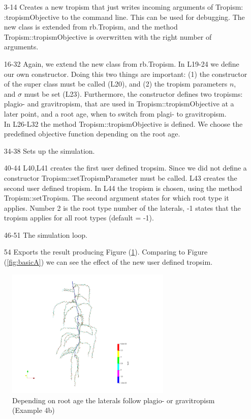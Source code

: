 \documentclass[a4paper]{article}
\begin{document}
\begin{itemize}

\item[3-14] Creates a new tropism that just writes incoming arguments of Tropism: :tropismObjective to the command line. This can be used for debugging. The new class is extended from rb.Tropism, 
and the method Tropism::tropismObjective is overwritten with the right number of arguments.

\item[16-32] Again, we extend the new class from rb.Tropism. In L19-24 we define our own constructor.
Doing this two things are important: (1) the constructor of the super class must be called (L20), and (2) the tropism parameters $n$, and $\sigma$ must be set (L23). 
Furthermore, the constructor defines two tropisms: plagio- and gravitropism, that are used in Tropism::tropismObjective at a later point, and a root age, when to switch from plagi- to gravitropism. \\
In L26-L32 the method Tropism::tropismObjective is defined. We choose the predefined objective function depending on the root age.

\item[34-38] Sets up the simulation.

\item[40-44] L40,L41 creates the first user defined tropsim. Since we did not define a constructor Tropism::setTropismParameter must be called. L43 creates the second user defined tropism. 
In L44 the tropism is chosen, using the method Tropism::setTropism. The second argument states for which root type it applies. 
Number 2 is the root type number of the laterals, -1 states that the tropism applies for all root types (default = -1).

\item[46-51] The simulation loop. 

\item [54] Exports the result producing Figure (\ref{fig:tropism}). Comparing to Figure (\ref{fig:basicA}) we can see the effect of the new user defined tropsim.

\end{itemize}

\begin{figure}
\centering
\includegraphics[width=0.7\textwidth]{example4b.png}
\caption{Depending on root age the laterals follow plagio- or gravitropism (Example 4b)} \label{fig:tropism}
\end{figure}
\end{document}
